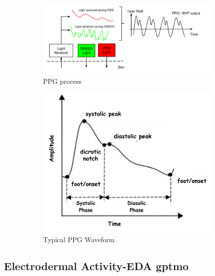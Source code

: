 \begin{figure}[!htbp]
    \centering
    \begin{subfigure}[b]{0.55\columnwidth}
        \includegraphics[width=\textwidth]{images/PPG.png}
        \caption{PPG process}
        \label{fig:ppg}
    \end{subfigure}
    \begin{subfigure}[b]{0.35\columnwidth}
        \includegraphics[width=\textwidth]{images/ppg2.pdf}
        \caption{Typical PPG Waveform}
        \label{fig:phone2}
    \end{subfigure}
    \caption{\parencite{emp} \parencite{apg}}
    \label{fig:phone}
\end{figure}



\subsection*{Electrodermal Activity-EDA \gls{gptmo}}
\label{subsec:EDAtheory}

